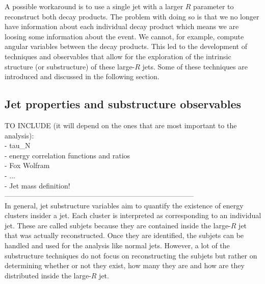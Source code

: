 
A possible workaround is to use a single jet with a larger $R$ parameter to reconstruct both decay products. The problem with doing so is that we no longer have information about each individual decay product which means we are loosing some information about the event. We cannot, for example, compute angular variables between the decay products. This led to the development of techniques and observables that allow for the exploration of the intrinsic structure (or substructure) of these large-$R$ jets. Some of these techniques are introduced and discussed in the following section.  

\subsection{Jet properties and substructure observables}
\label{section_jet_sub}

TO INCLUDE (it will depend on the ones that are most important to the analysis):\\
- tau\_N \\
- energy correlation functions and ratios \\
- Fox Wolfram\\
- ...\\
- Jet mass definition!\\
--------------------------------------------------------------------------------\\


In general, jet substructure variables aim to quantify the existence of energy clusters  insider a jet. Each cluster is interpreted as corresponding to an individual jet. These are called subjets because they are contained inside the large-$R$ jet that was actually reconstructed. Once they are identified, the subjets can be handled and used for the analysis like normal jets. However, a lot of the substructure techniques do not focus on reconstructing the subjets but rather on determining whether or not they exist, how many they are and how are they distributed inside the large-$R$ jet. 

